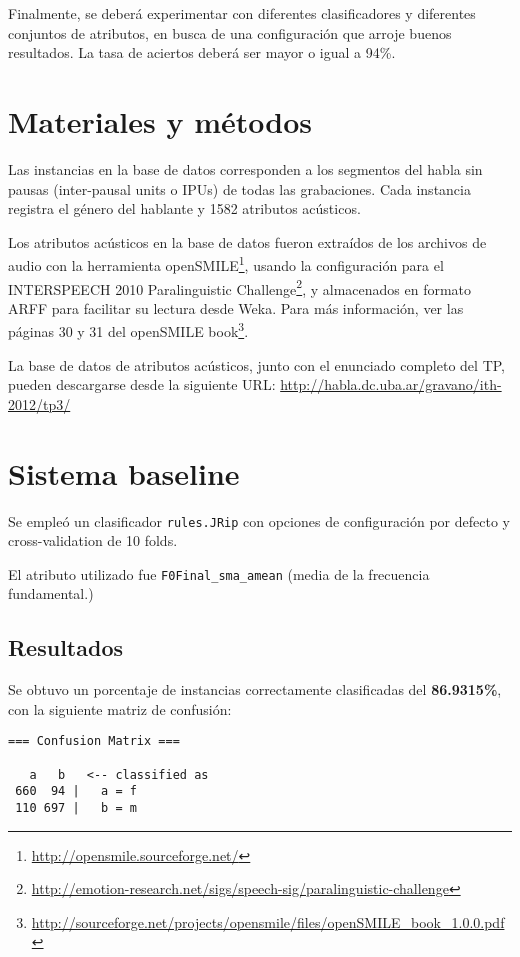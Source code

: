 \documentclass[10pt,a4paper]{article}
\begin{document}
Finalmente, se deberá experimentar con diferentes clasificadores y diferentes conjuntos de atributos, en busca de una configuración que arroje buenos resultados. La tasa de aciertos deberá ser mayor o igual a 94\%.

\section{Materiales y métodos}

Las instancias en la base de datos corresponden a los segmentos del habla sin pausas (inter-pausal units o IPUs) de todas las grabaciones. Cada instancia registra el género del hablante y 1582 atributos acústicos.

Los atributos acústicos en la base de datos fueron extraídos de los archivos de audio con la herramienta openSMILE\footnote{\url{http://opensmile.sourceforge.net/}}, usando la configuración para el INTERSPEECH 2010 Paralinguistic Challenge\footnote{\url{http://emotion-research.net/sigs/speech-sig/paralinguistic-challenge}}, y almacenados en formato ARFF para facilitar su lectura desde Weka. Para más información, ver las páginas 30 y 31 del openSMILE book\footnote{\url{http://sourceforge.net/projects/opensmile/files/openSMILE\_book\_1.0.0.pdf}}.

La base de datos de atributos acústicos, junto con el enunciado completo del TP, pueden descargarse desde la siguiente URL: \url{http://habla.dc.uba.ar/gravano/ith-2012/tp3/}

\section{Sistema baseline}

Se empleó un clasificador \texttt{rules.JRip} con opciones de configuración por defecto y cross-validation de 10 folds.

El atributo utilizado fue \texttt{F0Final\_sma\_amean} (media de la frecuencia fundamental.)

\subsection{Resultados}

Se obtuvo un porcentaje de instancias correctamente clasificadas del \textbf{86.9315\%}, con la siguiente matriz de confusión:

\begin{verbatim}
=== Confusion Matrix ===

   a   b   <-- classified as
 660  94 |   a = f
 110 697 |   b = m
\end{verbatim}
\end{document}
